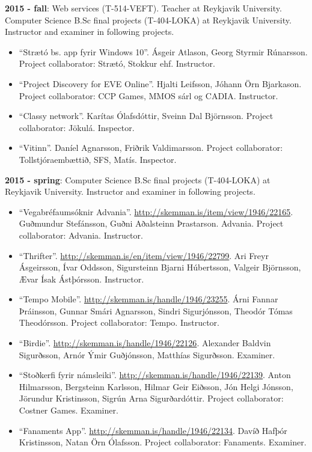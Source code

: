 \textbf{2015 - fall}: Web services (T-514-VEFT). Teacher at Reykjavik
University. Computer Science B.Sc final projects (T-404-LOKA) at Reykjavik
University. Instructor and examiner in following projects.

\begin{itemize}
\item ``Strætó bs. app fyrir Windows 10''. Ásgeir Atlason, Georg Styrmir
    Rúnarsson. Project collaborator: Strætó, Stokkur ehf. Instructor.

\item ``Project Discovery for EVE Online''. Hjalti Leifsson, Jóhann Örn
    Bjarkason. Project collaborator: CCP Games, MMOS sárl og CADIA. Instructor.

\item ``Classy network''. Karítas Ólafsdóttir, Sveinn Dal Björnsson. Project
    collaborator: Jökulá. Inspector.

\item ``Vitinn''. Daníel Agnarsson, Friðrik Valdimarsson. Project collaborator:
    Tollstjóraembættið, SFS, Matís. Inspector.
\end{itemize}


\textbf{2015 - spring}: Computer Science B.Sc final projects (T-404-LOKA) at Reykjavik University. Instructor and examiner in following projects.

\begin{itemize}
\item ``Vegabréfaumsóknir Advania''.
    \url{http://skemman.is/item/view/1946/22165}. Guðmundur Stefánsson, Guðni
        Aðalsteinn Þrastarson. Advania. Project collaborator: Advania.
        Instructor.

\item ``Thrifter''. \url {http://skemman.is/en/item/view/1946/22799}. Ari Freyr
    Ásgeirsson, Ívar Oddsson, Sigursteinn Bjarni Húbertsson, Valgeir Björnsson,
        Ævar Ísak Ástþórsson. Instructor.

\item ``Tempo Mobile''. \url{http://skemman.is/handle/1946/23255}. Árni Fannar
    Þráinsson, Gunnar Smári Agnarsson, Sindri Sigurjónsson, Theodór Tómas
        Theodórsson. Project collaborator: Tempo. Instructor.

\item ``Birdie''. \url{http://skemman.is/handle/1946/22126}. Alexander Baldvin
    Sigurðsson, Arnór Ýmir Guðjónsson, Matthías Sigurðsson. Examiner.

\item ``Stoðkerfi fyrir námsleiki''. \url{http://skemman.is/handle/1946/22139}.
    Anton Hilmarsson, Bergsteinn Karlsson, Hilmar Geir Eiðsson, Jón Helgi
        Jónsson, Jörundur Kristinsson, Sigrún Arna Sigurðardóttir. Project
        collaborator: Costner Games. Examiner.

\item ``Fanaments App''. \url{http://skemman.is/handle/1946/22134}. Davíð
    Hafþór Kristinsson, Natan Örn Ólafsson. Project collaborator: Fanaments.
        Examiner.
\end{itemize}

